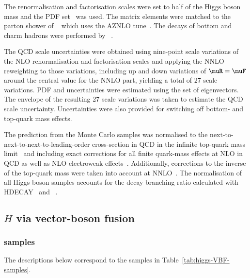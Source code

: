 The renormalisation and factorisation scales were set to half of the Higgs boson mass and the \PDFforLHC[15nnlo] PDF
set~\cite{Butterworth:2015oua} was used. The matrix elements were matched to the parton shower of \PYTHIA[8]~\cite{Sjostrand:2014zea}
which uses the AZNLO tune~\cite{STDM-2012-23}. The decays of bottom and charm hadrons
were performed by \EVTGEN~\cite{Lange:2001uf}.

The QCD scale uncertainties were obtained using nine-point scale variations of the NLO renormalisation and factorisation scales and applying the NNLO reweighting to those variations, including up and down variations of $\muR=\muF$ around the central value for the NNLO part, yielding a total of 27 scale variations.
PDF and \alphas uncertainties were estimated using the \PDFforLHC[15nlo] set of eigenvectors.
The envelope of the resulting 27 scale variations was taken to estimate the QCD scale uncertainty. 
Uncertainties were also provided for switching off bottom- and top-quark mass effects.

The prediction from the Monte Carlo samples was normalised to the next-to-next-to-next-to-leading-order 
cross-section in QCD in the infinite top-quark mass 
limit~\cite{deFlorian:2016spz,Anastasiou:2016cez,Anastasiou:2015ema,Dulat:2018rbf,Aglietti:2004nj} and including exact 
corrections for all finite quark-mass effects at NLO in QCD as well as NLO electroweak 
effects~\cite{Actis:2008ug,Bonetti:2018ukf}. Additionally, corrections to the inverse of the top-quark mass were taken 
into account at NNLO~\cite{Harlander:2009mq,Harlander:2009bw,Harlander:2009my,Pak:2009dg}. 
The normalisation of all Higgs boson samples accounts for the decay branching ratio calculated with 
HDECAY~\cite{Djouadi:1997yw,Spira:1997dg,Djouadi:2006bz}
and \PROPHECY~\cite{Bredenstein:2006ha,Bredenstein:2006rh,Bredenstein:2006nk}.


\subsection{$H$ via vector-boson fusion}

\subsubsection*{\texorpdfstring{\POWPY[8]}{Powheg+Pythia8} samples}

The descriptions below correspond to the samples in Table~\ref{tab:higgs-VBF-samples}.

